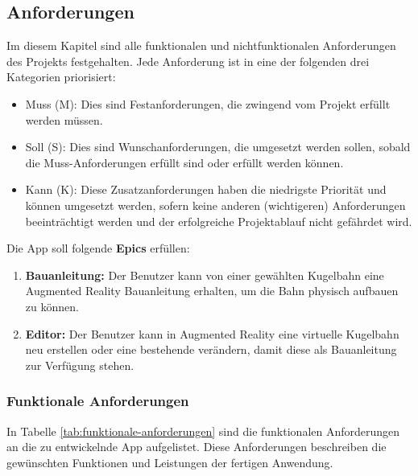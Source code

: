 \subsection{Anforderungen}
Im diesem Kapitel sind alle funktionalen und nichtfunktionalen Anforderungen des Projekts festgehalten. Jede Anforderung ist in eine der folgenden drei Kategorien priorisiert:
\begin{itemize}
	\item Muss (M): Dies sind Festanforderungen, die zwingend vom Projekt erfüllt werden müssen.
	\item Soll (S): Dies sind Wunschanforderungen, die umgesetzt werden sollen, sobald die Muss-Anforderungen erfüllt sind oder erfüllt werden können.
	\item Kann (K): Diese Zusatzanforderungen haben die niedrigste Priorität und können umgesetzt werden, sofern keine anderen (wichtigeren) Anforderungen beeinträchtigt werden und der erfolgreiche Projektablauf nicht gefährdet wird.
\end{itemize}

Die App soll folgende \textbf{Epics} erfüllen:
\begin{enumerate}
	\item \textbf{Bauanleitung:} Der Benutzer kann von einer gewählten Kugelbahn eine Augmented Reality Bauanleitung erhalten, um die Bahn physisch aufbauen zu können.
	\item \textbf{Editor:} Der Benutzer kann in Augmented Reality eine virtuelle Kugelbahn neu erstellen oder eine bestehende verändern, damit diese als Bauanleitung zur Verfügung stehen.
\end{enumerate}

\subsubsection{Funktionale Anforderungen}
In Tabelle \ref{tab:funktionale-anforderungen} sind die funktionalen Anforderungen an die zu entwickelnde App aufgelistet. Diese Anforderungen beschreiben die gewünschten Funktionen und Leistungen der fertigen Anwendung.

